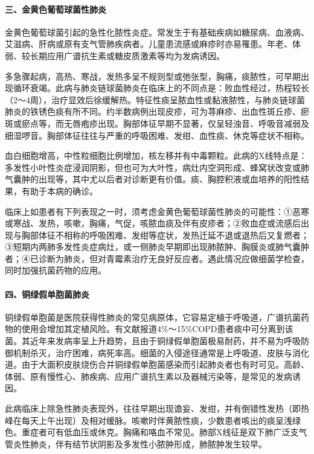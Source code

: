 \paragraph{三、金黄色葡萄球菌性肺炎}

金黄色葡萄球菌引起的急性化脓性炎症。常发生于有基础疾病如糖尿病、血液病、艾滋病、肝病或原有支气管肺疾病者。儿童患流感或麻疹时亦易罹患。年老、体弱、较长期应用广谱抗生素或糖皮质激素等均为发病诱因。

多急骤起病，高热、寒战，发热多呈不规则型或弛张型，胸痛，痰脓性，可早期出现循环衰竭。此病与肺炎链球菌肺炎在临床上的不同点是：败血性经过，热程较长（2～4周），治疗显效后徐缓解热。特征性痰呈脓血性或黏液脓性，与肺炎链球菌肺炎的铁锈色痰有所不同。约半数病例出现皮疹，可为荨麻疹、出血性斑丘疹、瘀斑或瘀点等，而无唇疱疹出现。胸部体征早期不显著，仅呈轻浊音、呼吸音减弱及细湿啰音。胸部体征往往与严重的呼吸困难、发绀、血性痰、休克等症状不相称。

血白细胞增高，中性粒细胞比例增加，核左移并有中毒颗粒。此病的X线特点是：多发性小叶性炎症浸润阴影，但也可为大叶性，病灶内空洞形成、蜂窝状改变或肺气囊肿的出现等，其中尤以后者对诊断更有价值。痰、胸腔积液或血培养的阳性结果，有助于本病的确诊。

临床上如患者有下列表现之一时，须考虑金黄色葡萄球菌性肺炎的可能性：①恶寒或寒战、发热，咳嗽，胸痛，气促，咳脓血痰及伴有皮疹者；②败血症或流感后出现与胸部体征不相称的呼吸困难、发绀等症状，发热迁延不退或退热后又复燃者；③短期内两肺多发性炎症病灶，或一侧肺炎早期即出现肺脓肿、胸膜炎或肺气囊肿者；④已诊断为肺炎，但对青霉素治疗无良好反应者。遇此情况应做细菌学检查，同时加强抗菌药物的应用。

\paragraph{四、铜绿假单胞菌肺炎}

铜绿假单胞菌是医院获得性肺炎的常见病原体，它容易定植于呼吸道，广谱抗菌药物的使用会增加其定植风险。有文献报道4\%～15\%COPD患者痰中可分离到该菌。其近年来发病率呈上升趋势，且由于铜绿假单胞菌极易耐药，并不易为呼吸防御机制杀灭，治疗困难，病死率高。细菌的入侵途径通常是上呼吸道、皮肤与消化道。由于大面积皮肤烧伤合并铜绿假单胞菌感染而引起肺炎者也有时可见。高龄、体弱、原有慢性心、肺疾病、应用广谱抗生素以及器械污染等，是常见的发病诱因。

此病临床上除急性肺炎表现外，往往早期出现谵妄、发绀，并有倒错性发热（即热峰在每天上午出现）及相对缓脉。咳嗽时伴黄脓性痰，少数患者咳出的痰呈浅绿色。重症者可有低血压或休克。胸痛和咯血不常见。肺部X线征是双下肺广泛支气管炎性肺炎，伴有结节状阴影及多发性小脓肿形成，肺脓肿发生较早。

